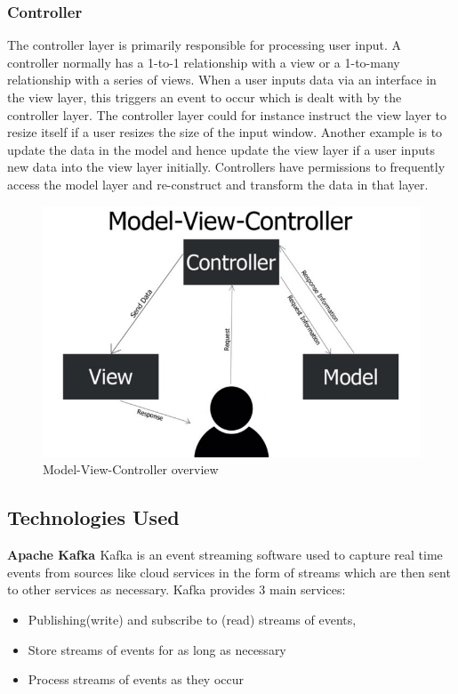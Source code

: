 \subsubsection{Controller}
The controller layer is primarily responsible for processing user input.  A controller normally has a 1-to-1 relationship with a view or a 1-to-many relationship with a series of views.  When a user inputs data via an interface in the view layer,  this triggers an event to occur which is dealt with by the controller layer. The controller layer could for instance instruct the view layer to resize itself if a user resizes the size of the input window.  Another example is to update the data in the model and hence update the view layer if a user inputs new data into the view layer initially.  Controllers have permissions to frequently access the model layer and re-construct and transform the data in that layer.

\begin{figure}[ht]
  \centering
  \includegraphics[scale=0.35]{multicurrency/mvc.jpg}
  \caption{Model-View-Controller overview \cite{mvc-pic}}
\end{figure}

\subsection{Technologies Used}
\textbf{Apache Kafka \cite{kafka-docs}}
Kafka is an event streaming software used to capture real time events from sources like cloud services in the form of streams which are then sent to other services as necessary. Kafka provides 3 main services: \begin{itemize}
\item Publishing(write) and subscribe to (read) streams of events,
\item Store streams of events for as long as necessary
\item Process streams of events as they occur
\end{itemize}

